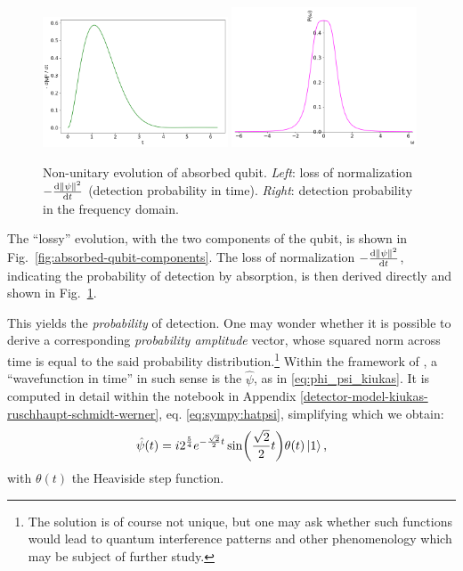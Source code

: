 \begin{figure}
  \centering
  \includegraphics[width=0.49\textwidth]{img/2ldetect/qubit_normalization_loss.png}
  \includegraphics[width=0.49\textwidth]{img/2ldetect/P_omega.png}
  \caption{
    Non-unitary evolution of absorbed qubit.
    \emph{Left}: loss of normalization $-\dv{\norm{\psi}^2}{t}$ (detection probability in time).
    \emph{Right}: detection probability in the frequency domain.
  }
  \label{fig:absorbed-qubit-normalization-loss}
\end{figure}

The ``lossy'' evolution, with the two components of the qubit, is shown in Fig.~\ref{fig:absorbed-qubit-components}.
The loss of normalization $-\dv{\norm{\psi}^2}{t}$, indicating the probability of detection by absorption,
is then derived directly and shown in Fig.~\ref{fig:absorbed-qubit-normalization-loss}.

This yields the \emph{probability} of detection.
One may wonder whether it is possible to derive a corresponding \emph{probability amplitude} vector,
whose squared norm across time is equal to the said probability distribution.\footnote{
  The solution is of course not unique, but one may ask whether such functions would lead
  to quantum interference patterns and other phenomenology which may be subject of further study.
}
Within the framework of \cite{RuschhauptAbsorption}, a ``wavefunction in time'' in such sense
is the $\hat{\psi}$, as in \eqref{eq:phi_psi_kiukas}.
It is computed in detail within the
notebook in Appendix \ref{detector-model-kiukas-ruschhaupt-schmidt-werner}, eq. \eqref{eq:sympy:hatpsi},
simplifying which we obtain:
\begin{equation}\label{eq:analytic:hatpsi}
  \hat{\psi}(t) =
    i 2^{\frac{5}{4}} e^{-\frac{\sqrt{2}}{2}t}\sin(\frac{\sqrt{2}}{2}t) \theta(t)
    \ket{1}
    \text{,}
\end{equation}
with $\theta(t)$ the Heaviside step function.

